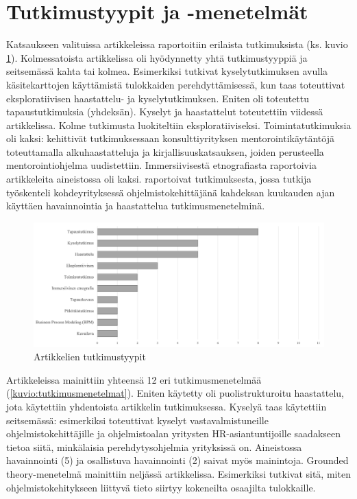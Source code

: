 \documentclass[utf8]{gradu3}
\begin{document}
\section{Tutkimustyypit ja -menetelmät}
\label{luku-tulokset-tutkimustyypit-ja-menetelmat}

Katsaukseen valituissa artikkeleissa raportoitiin erilaista tutkimuksista (ks. kuvio \ref{kuvio:tutkimustyypit}). Kolmessatoista artikkelissa oli hyödynnetty yhtä tutkimustyyppiä ja seitsemässä kahta tai kolmea. Esimerkiksi \textcite{azanza-ym-2021} tutkivat kyselytutkimuksen avulla käsitekarttojen käyttämistä tulokkaiden perehdyttämisessä, kun taas \textcite{pham-ym-2017} toteuttivat eksploratiivisen haastattelu- ja kyselytutkimuksen. Eniten oli toteutettu tapaustutkimuksia (yhdeksän). Kyselyt ja haastattelut toteutettiin viidessä artikkelissa. Kolme tutkimusta luokiteltiin eksploratiiviseksi. Toimintatutkimuksia oli kaksi: \textcite{bjornson-dingsøyr-2005} kehittivät tutkimuksessaan konsulttiyrityksen mentorointikäytäntöjä toteuttamalla alkuhaastatteluja ja kirjallisuuskatsauksen, joiden perusteella mentorointiohjelma uudistettiin. Immersiivisestä etnografiasta raportoivia artikkeleita aineistossa oli kaksi. \textcite{kumar-ym-2016} raportoivat tutkimuksesta, jossa tutkija työskenteli kohdeyrityksessä ohjelmistokehittäjänä kahdeksan kuukauden ajan käyttäen havainnointia ja haastattelua tutkimusmenetelminä.

\begin{figure}[h]
    \centering
    \includegraphics[width=\textwidth]{media/tutkimustyypit.png}
    \caption{Artikkelien tutkimustyypit}
    \label{kuvio:tutkimustyypit}
\end{figure}

Artikkeleissa mainittiin yhteensä 12 eri tutkimusmenetelmää (\ref{kuvio:tutkimusmenetelmat}). Eniten käytetty oli puolistrukturoitu haastattelu, jota käytettiin yhdentoista artikkelin tutkimuksessa. Kyselyä taas käytettiin seitsemässä: esimerkiksi \textcite{kulkarni-ym-2010} toteuttivat kyselyt vastavalmistuneille ohjelmistokehittäjille ja ohjelmistoalan yritysten HR-asiantuntijoille saadakseen tietoa siitä, minkälaisia perehdytysohjelmia yrityksissä on. Aineistossa havainnointi (5) ja osallistuva havainnointi (2) saivat myös mainintoja. Grounded theory-menetelmä mainittiin neljässä artikkelissa. Esimerkiksi \textcite{viana-ym-2014} tutkivat sitä, miten ohjelmistokehitykseen liittyvä tieto siirtyy kokeneilta osaajilta tulokkaille. 
\end{document}
